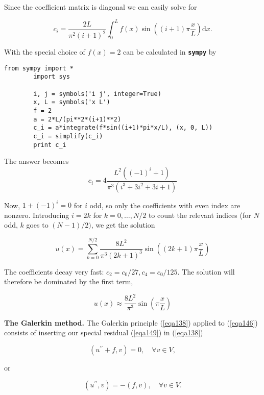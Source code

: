 \documentclass[../main.tex]{subfiles}
\begin{document}
	\noindent Since the coefficient matrix is diagonal we can easily solve for
	
	\begin{equation}
		\label{eqa155}
		c_{i}=\frac{2 L}{\pi^{2}(i+1)^{2}} \int_{0}^{L} f(x) \sin \left((i+1) \pi \frac{x}{L}\right) 	\mathrm{d} x .
	\end{equation}

	\noindent With the special choice of $f(x)=2$ can be calculated in \textbf{\texttt{sympy}} by
	
	\begin{lstlisting}[numbers=none]
		from sympy import *
		import sys
		
		i, j = symbols('i j', integer=True)
		x, L = symbols('x L')
		f = 2
		a = 2*L/(pi**2*(i+1)**2)
		c_i = a*integrate(f*sin((i+1)*pi*x/L), (x, 0, L))
		c_i = simplify(c_i)
		print c_i
	\end{lstlisting}
	
	\noindent The answer becomes
	$$ c_{i}=4 \frac{L^{2}\left((-1)^{i}+1\right)}{\pi^{3}\left(i^{3}+3 i^{2}+3 i+1\right)}$$
	
	\noindent Now, $1+(-1)^{i}=0$ for $i$ odd, so only the coefficients with even index are nonzero. Introducing $i=2 k$ for $k=0, \ldots, N / 2$ to count the relevant indices (for $N$ odd, $k$ goes to $(N-1) / 2)$, we get the solution 

	\begin{equation}
		\label{eqa156}
		u(x)=\sum_{k=0}^{N / 2} \frac{8 L^{2}}{\pi^{3}(2 k+1)^{3}} \sin \left((2 k+1) \pi 	\frac{x}{L}\right)
	\end{equation}

	\noindent The coefficients decay very fast: $c_{2}=c_{0} / 27, c_{4}=c_{0} / 125$. The solution will therefore be dominated by the first term,

	$$ u(x) \approx \frac{8 L^{2}}{\pi^{3}} \sin \left(\pi \frac{x}{L}\right) $$

	\noindent\textbf{The Galerkin method.   } The Galerkin principle (\ref{eqa138}) applied to (\ref{eqa146}) consists of inserting our special residual (\ref{eqa149}) in (\ref{eqa138})

	$$ \left(u^{\prime \prime}+f, v\right)=0, \quad \forall v \in V, $$
	
	\noindent or
	
	\begin{equation}
		\label{eqa157}
		\left(u^{\prime \prime}, v\right)=-(f, v), \quad \forall v \in V .
	\end{equation}\
\end{document}
